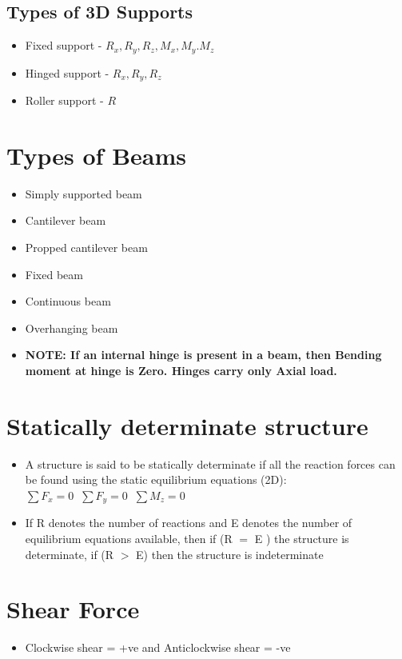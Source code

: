 \documentclass[8pt]{report}
\begin{document}
		\subsection{Types of 3D Supports}
			\begin{itemize}
				\item Fixed support - $R_x,R_y,R_z,M_x,M_y.M_z$
				\item Hinged support - $R_x,R_y,R_z$
				\item Roller support - $R$
			\end{itemize}\hrulefill			
	\section{Types of Beams}
		\begin{itemize}
			\item Simply supported beam
			\item Cantilever beam
			\item Propped cantilever beam
			\item Fixed beam
			\item Continuous beam
			\item Overhanging beam
			\item \textbf{NOTE: If an internal hinge is present in a beam, then Bending moment at hinge is Zero. Hinges carry only Axial load.}
		\end{itemize}\hrulefill
	\section{Statically determinate structure}
		\begin{itemize}
			\item A structure is said to be statically determinate if all the reaction forces can be found using the static equilibrium equations (2D): $\boxed{\sum F_x=0\;\;\sum F_y=0\;\;\sum M_z=0}$
			\item If R denotes the number of reactions and E denotes the number of equilibrium equations available, then if (R $=$ E ) the structure is determinate, if (R $>$ E) then the structure is indeterminate
		\end{itemize}\hrulefill
	\section{Shear Force}
		\begin{itemize}
			\item Clockwise shear = +ve and Anticlockwise shear = -ve
		\end{itemize}\hrulefill
\end{document}
